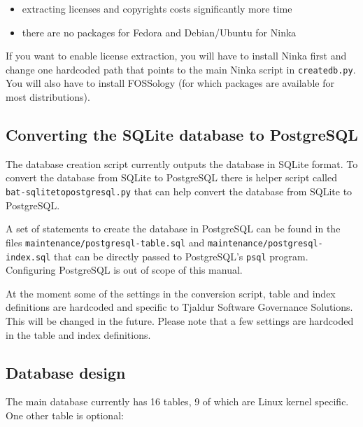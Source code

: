 \documentclass[10pt,a4paper]{article}
\begin{document}
\begin{itemize}
\item extracting licenses and copyrights costs significantly more time
\item there are no packages for Fedora and Debian/Ubuntu for Ninka
\end{itemize}

If you want to enable license extraction, you will have to install Ninka first
and change one hardcoded path that points to the main Ninka script in
\texttt{createdb.py}. You will also have to install FOSSology
(for which packages are available for most distributions).

\subsection{Converting the SQLite database to PostgreSQL}

The database creation script currently outputs the database in SQLite format.
To convert the database from SQLite to PostgreSQL there is helper script called
\texttt{bat-sqlitetopostgresql.py} that can help convert the database from
SQLite to PostgreSQL.

A set of statements to create the database in PostgreSQL can be found in the
files \texttt{maintenance/postgresql-table.sql} and
\texttt{maintenance/postgresql-index.sql} that can be directly passed to
PostgreSQL's \texttt{psql} program. Configuring PostgreSQL is out of scope of
this manual.

At the moment some of the settings in the conversion script, table and index
definitions are hardcoded and specific to Tjaldur Software Governance
Solutions. This will be changed in the future. Please note that a few settings
are hardcoded in the table and index definitions.

\subsection{Database design}

The main database currently has 16 tables, 9 of which are Linux kernel specific.
One other table is optional:
\end{document}
